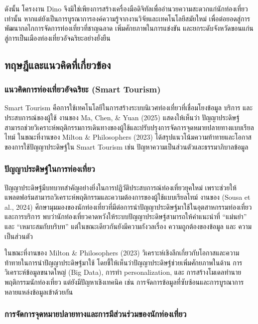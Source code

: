 ดังนั้น โครงงาน Dino จึงมิใช่เพียงการสร้างเครื่องมือดิจิทัลเพื่ออำนวยความสะดวกแก่นักท่องเที่ยวเท่านั้น หากแต่ยังเป็นการบูรณาการองค์ความรู้จากงานวิจัยและเทคโนโลยีสมัยใหม่ เพื่อต่อยอดสู่การพัฒนากลไกการจัดการท่องเที่ยวที่ชาญฉลาด เพิ่มศักยภาพในการแข่งขัน และยกระดับจังหวัดขอนแก่นสู่การเป็นเมืองท่องเที่ยวอัจฉริยะอย่างยั่งยืน

\subsection{ทฤษฎีและแนวคิดที่เกี่ยวข้อง}

\subsubsection{แนวคิดการท่องเที่ยวอัจฉริยะ (Smart Tourism)}

Smart Tourism คือการใช้เทคโนโลยีในการสร้างระบบนิเวศท่องเที่ยวที่เชื่อมโยงข้อมูล บริการ และประสบการณ์ของผู้ใช้ งานของ Ma, Chen, \& Yuan (2025) แสดงให้เห็นว่า ปัญญาประดิษฐ์สามารถช่วยวิเคราะห์พฤติกรรมการเดินทางของผู้ใช้และปรับปรุงการจัดการจุดหมายปลายทางแบบเรียลไทม์ ในขณะที่งานของ Milton \& Philosophers (2023) ได้สรุปแนวโน้มความท้าทายและโอกาสของการใช้ปัญญาประดิษฐ์ใน Smart Tourism เช่น ปัญหาความเป็นส่วนตัวและธรรมาภิบาลข้อมูล

\subsubsection{ปัญญาประดิษฐ์ในการท่องเที่ยว}

ปัญญาประดิษฐ์มีบทบาทสำคัญอย่างยิ่งในการปฏิวัติประสบการณ์ท่องเที่ยวยุคใหม่ เพราะช่วยให้แพลตฟอร์มสามารถวิเคราะห์พฤติกรรมและความต้องการของผู้ใช้แบบเรียลไทม์ งานของ (Sousa et al., 2024) ศึกษามุมมองของนักท่องเที่ยวที่มีต่อการนำปัญญาประดิษฐ์มาใช้ในอุตสาหกรรมท่องเที่ยวและการบริการ พบว่านักท่องเที่ยวคาดหวังให้ระบบปัญญาประดิษฐ์สามารถให้คำแนะนำที่ ``แม่นยำ'' และ ``เหมาะสมกับบริบท'' แต่ในขณะเดียวกันยังมีความกังวลเรื่อง ความถูกต้องของข้อมูล และ ความเป็นส่วนตัว

ในขณะที่งานของ Milton \& Philosophers (2023) วิเคราะห์เชิงลึกเกี่ยวกับโอกาสและความท้าทายในการนำปัญญาประดิษฐ์มาใช้ โดยชี้ให้เห็นว่าปัญญาประดิษฐ์ช่วยเพิ่มศักยภาพในด้าน การวิเคราะห์ข้อมูลขนาดใหญ่ (Big Data), การทำ personalization, และ การสร้างโมเดลทำนายพฤติกรรมนักท่องเที่ยว แต่ยังมีปัญหาเชิงเทคนิค เช่น การจัดการข้อมูลที่ซับซ้อนและการบูรณาการหลายแหล่งข้อมูลเข้าด้วยกัน

\subsubsection{การจัดการจุดหมายปลายทางและการมีส่วนร่วมของนักท่องเที่ยว}

